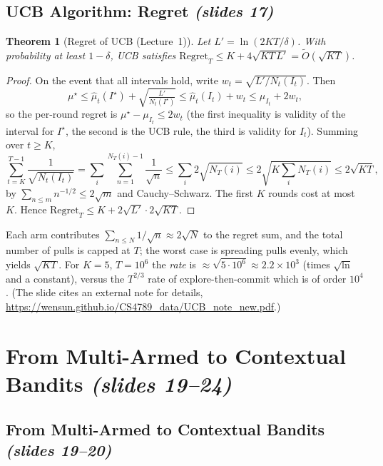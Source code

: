 \documentclass[11pt,a4paper]{article}
\newcommand{\Reg}{\mathrm{Regret}}
\newcommand{\slides}[1]{\emph{(slides #1)}}
\theoremstyle{plain}
\newtheorem{theorem}{Theorem}[section]
\theoremstyle{definition}
\theoremstyle{remark}
\begin{document}
\subsection{UCB Algorithm: Regret \slides{17}}

\begin{theorem}[Regret of UCB (Lecture~1)]\label{thm:ucb}
Let $L'=\ln(2KT/\delta)$. With probability at least $1-\delta$, UCB satisfies
$\Reg_T\le K+4\sqrt{KT\,L'}=\widetilde O(\sqrt{KT})$.
\end{theorem}
\begin{proof}
On the event that all intervals hold, write $w_t=\sqrt{L'/N_t(I_t)}$. Then
\[
 \mu^\star\le \hat\mu_t(I^\star)+\sqrt{\tfrac{L'}{N_t(I^\star)}}\le \hat\mu_t(I_t)+w_t\le\mu_{I_t}+2w_t,
\]
so the per-round regret is $\mu^\star-\mu_{I_t}\le 2w_t$ (the first inequality is validity of the interval for $I^\star$, the second is the UCB rule, the third is validity for $I_t$). Summing over $t\ge K$,
\[
 \sum_{t=K}^{T-1}\frac1{\sqrt{N_t(I_t)}}=\sum_{i}\sum_{n=1}^{N_T(i)-1}\frac1{\sqrt n}\le\sum_i 2\sqrt{N_T(i)}\le 2\sqrt{K\textstyle\sum_iN_T(i)}\le2\sqrt{KT},
\]
by $\sum_{n\le m}n^{-1/2}\le2\sqrt m$ and Cauchy--Schwarz. The first $K$ rounds cost at most $K$. Hence $\Reg_T\le K+2\sqrt{L'}\cdot2\sqrt{KT}$.
\end{proof}

\begin{intuition}
Each arm contributes $\sum_{n\le N}1/\sqrt n\approx2\sqrt N$ to the regret sum, and the total number of pulls is capped at $T$; the worst case is spreading
pulls evenly, which yields $\sqrt{KT}$. For $K=5$, $T=10^6$ the \emph{rate} is $\approx\sqrt{5\cdot10^6}\approx2.2\times10^3$ (times $\sqrt{\ln}$ and a constant),
versus the $T^{2/3}$ rate of explore-then-commit which is of order $10^4$. (The slide cites an external note for details, \url{https://wensun.github.io/CS4789_data/UCB_note_new.pdf}.)
\end{intuition}
\section{From Multi-Armed to Contextual Bandits \slides{19--24}}

\subsection{From Multi-Armed to Contextual Bandits \slides{19--20}}
\end{document}
